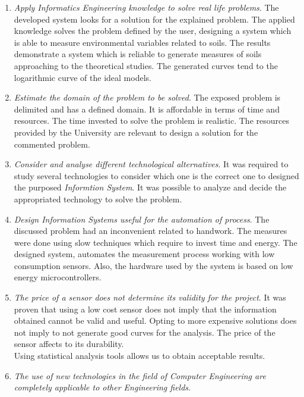 \begin{enumerate}

\item \textit{Apply Informatics Engineering knowledge to solve real life problems}. The developed system looks for a solution for the explained problem. The applied knowledge solves the problem defined by the user, designing a system which is able to measure environmental variables related to soils. The results demonstrate a system which is reliable to generate measures of soils approaching to the theoretical studies. The generated curves tend to the logarithmic curve of the ideal models.

\item \textit{Estimate the domain of the problem to be solved}. The exposed problem is delimited and has a defined domain. It is affordable in terms of time and resources. The time invested to solve the problem is realistic. The resources provided by the University are relevant to design a solution for the commented problem.

\item \textit{Consider and analyse different technological alternatives}. It was required to study several technologies to consider which one is the correct one to designed the purposed \textit{Informtion System}. It was possible to analyze and decide the appropriated technology to solve the problem.

\item \textit{Design Information Systems useful for the automation of process}. The discussed problem had an inconvenient related to handwork. The measures were done using slow techniques which require to invest time and energy. The designed system, automates the measurement process working with low consumption sensors. Also, the hardware used by the system is based on low energy microcontrollers.

\item \textit{The price of a sensor does not determine its validity for the project}. It was proven that using a low cost sensor does not imply that the information obtained cannot be valid and useful. Opting to more expensive solutions does not imply to not generate good curves for the analysis. The price of the sensor affects to its durability.\\

Using statistical analysis tools allows us to obtain acceptable results.

\item \textit{The use of new technologies in the field of Computer Engineering are completely applicable to other Engineering fields}.\\


\end{enumerate}
